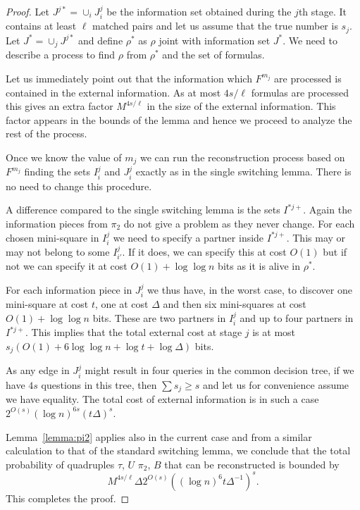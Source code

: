 \documentclass{theoretics}
\begin{document}
\begin{proof}
Let $J^{j*}=\cup_{i} J_i^j$ be the information set obtained
during the $j$th stage.
It contains at least $\ell$ matched
pairs and let us assume that the true number is $s_j$. 
Let  $J^*=\cup_j J^{j*}$ and define $\rho^*$ as
$\rho$ joint with information set $J^*$.  
We need to describe a process to find $\rho$
from $\rho^*$ and the set of formulas.

Let us
immediately point out that the information which $F^{m_j}$
are processed is contained in the external information.
As at most $4s/\ell$ formulas are processed this gives an
extra factor $M^{4s / \ell}$ in the size of the external
information.  This factor appears in the bounds of the
lemma and hence we proceed to analyze the rest of the
process.

Once we know the value of $m_j$ we can run the
reconstruction process based on  $F^{m_j}$ finding the
sets $I_i^j$ and $J_i^j$ exactly
as in the single switching lemma. There is no need to change
this procedure.

A difference compared to the single switching lemma is
the sets $I^{*j+}$.  Again the information pieces from
$\pi_2$ do not give a problem as they never change.
For each chosen mini-square in $I_i^j$ we need to specify a partner 
inside $I^{*j+}$.  This may or may not belong to some $I_{i'}^j$.
If it does, we can specify this at cost $O(1)$ but if not
we can specify it at cost $O(1)+ \log \log n$ bits as it is alive
in $\rho^*$.

For each information piece in $J_i^j$ we thus have,
in the worst case, to discover one mini-square
at cost $t$, one at cost $\Delta$ and then
six mini-squares at cost $O(1)+\log \log n$ bits.  These
are two partners in $I_i^j$ and up to four
partners in $I^{*j+}$.
This implies that the total external cost at stage
$j$ is at most $s_j(O(1)+6 \log \log n+\log t + \log {\Delta})$ bits.

As any edge in $J_i^j$ might result in four queries in the
common decision tree, if we have $4s$ questions in
this tree, then $\sum s_j\geq s$ and let us for convenience
assume we have equality.  The total cost of external information
is in such a case $2^{O(s)} (\log n)^{6s} (t \Delta)^s$.

Lemma~\ref{lemma:pi2} applies also in the current case and from 
a similar calculation to that of the standard
switching lemma, we conclude that the total probability
of quadruples $\tau$, $U$ $\pi_2$, $B$
that can be reconstructed is bounded by 
$$M^{4s/\ell}\Delta 2^{O(s)} ((\log n)^{6} t \Delta^{-1})^s.$$
This completes the proof.
\end{proof}
\end{document}

